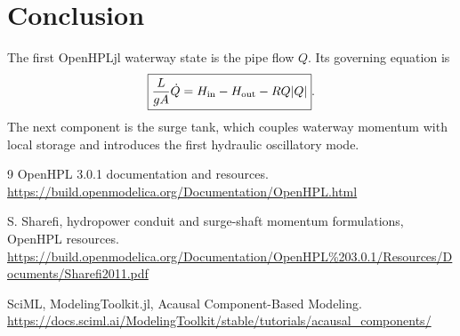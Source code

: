 \documentclass[11pt,a4paper]{article}
\begin{document}
\section*{Conclusion}
The first OpenHPLjl waterway state is the pipe flow $Q$. Its governing equation is
\[
\boxed{\frac{L}{gA}\dot Q=H_{\rm in}-H_{\rm out}-RQ|Q|}.
\]
The next component is the surge tank, which couples waterway momentum with local storage and introduces the first hydraulic oscillatory mode.

\begin{thebibliography}{9}
OpenHPL 3.0.1 documentation and resources.\newline
\url{https://build.openmodelica.org/Documentation/OpenHPL.html}

S. Sharefi, hydropower conduit and surge-shaft momentum formulations, OpenHPL resources.\newline
\url{https://build.openmodelica.org/Documentation/OpenHPL%203.0.1/Resources/Documents/Sharefi2011.pdf}

SciML, ModelingToolkit.jl, Acausal Component-Based Modeling.\newline
\url{https://docs.sciml.ai/ModelingToolkit/stable/tutorials/acausal_components/}
\end{thebibliography}
\end{document}

